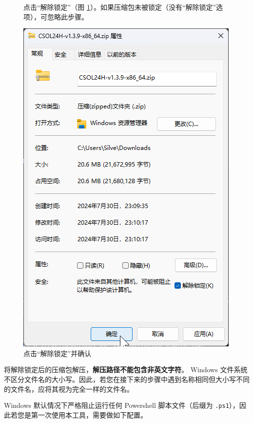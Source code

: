 \begin{figure}[H]
    \Centering
    \parbox[l]{\textwidth}{点击“解除锁定”（图 \ref{ch0fig-unlock-1}）。如果压缩包未被锁定（没有“解除锁定”选项），可忽略此步骤。}
    \includegraphics[width=\textwidth]{assets/intro/unlock_01.png}
    \caption{点击“解除锁定”并确认}
    \label{ch0fig-unlock-1}
\end{figure}

将解除锁定后的压缩包解压，\textbf{\color{red}解压路径不能包含非英文字符}。
Windows 文件系统不区分文件名的大小写。因此，若您在接下来的步骤中遇到名称相同但大小写不同的文件名，应将其视为完全一样的文件名。

Windows 默认情况下严格阻止运行任何 Powershell 脚本文件（后缀为 \lstinline{.ps1}），因此若您是第一次使用本工具，需要做如下配置。

